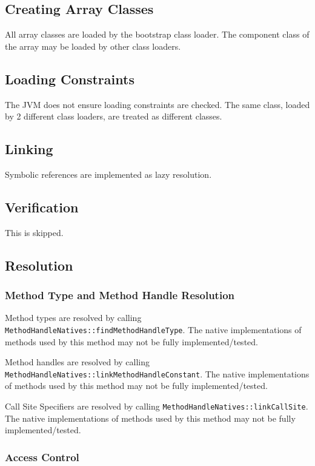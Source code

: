 \subsection{Creating Array Classes}

All array classes are loaded by the bootstrap class loader. 
The component class of the array may be loaded by other class loaders.

\subsection{Loading Constraints}

The JVM does not ensure loading constraints are checked. The same class, loaded by 2 different class loaders, are treated as different classes.

\subsection{Linking}

Symbolic references are implemented as lazy resolution.

\subsection{Verification}

This is skipped.

\subsection{Resolution}

\subsubsection{Method Type and Method Handle Resolution}

Method types are resolved by calling \texttt{MethodHandleNatives::findMethodHandleType}. The native implementations of methods used by this method may not be fully implemented/tested.

Method handles are resolved by calling \texttt{MethodHandleNatives::linkMethodHandleConstant}. The native implementations of methods used by this method may not be fully implemented/tested.

Call Site Specifiers are resolved by calling \texttt{MethodHandleNatives::linkCallSite}. The native implementations of methods used by this method may not be fully implemented/tested.

\subsubsection{Access Control}

